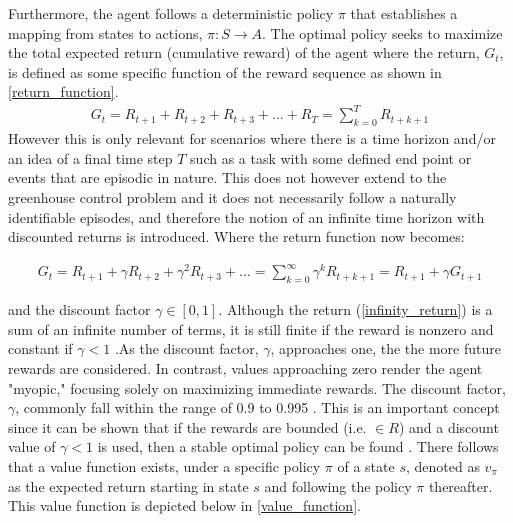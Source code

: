 Furthermore, the agent follows a deterministic policy $\pi$ that establishes a mapping from states to actions, $\pi: S \rightarrow A$. The optimal policy seeks to maximize the total expected return (cumulative reward) of the agent where the return, $G_t$, is defined as some specific function of the reward sequence \cite{suttonReinforcementLearningIntroduction2014} as shown in \autoref{return_function}. 
\begin{equation}
	\begin{aligned}
		G_t  = R_{t+1} + R_{t+2} + R_{t+3} + \dots + R_{T} = \sum_{k=0}^TR_{t+k+1}
	\end{aligned}
	\label{return_function}
\end{equation}
However this is only relevant for scenarios where there is a time horizon and/or an idea of a final time step $T$ such as a task with some defined end point or events that are episodic in nature. This does not however extend to the greenhouse control problem and it does not necessarily follow a naturally identifiable episodes, and therefore the notion of an infinite time horizon with discounted returns is introduced. Where the return function now becomes:

\begin{equation}
	\begin{aligned}
		G_t  = R_{t+1} + \gamma R_{t+2} + \gamma^2 R_{t+3} + \dots = \sum_{k=0}^\infty \gamma^k R_{t+k+1} = R_{t+1} + \gamma G_{t+1}
	\end{aligned}
	\label{infinity_return}
\end{equation}

and the discount factor $\gamma \in [0,1]$. Although the return (\autoref{infinity_return}) is a sum of an infinite number of terms, it is still finite if the reward is nonzero and constant if $\gamma < 1$ \cite{suttonReinforcementLearningIntroduction2014}.As the discount factor, $\gamma$, approaches one, the the more future rewards are considered.  In contrast, values approaching zero render the agent "myopic," focusing solely on maximizing immediate rewards. The discount factor, $\gamma$, commonly fall within the range of 0.9 to 0.995 \cite{vandenbemdRobustDeepReinforcement}. This is an important concept since it can be shown that if the rewards are bounded (i.e. $\in R$) and a discount value of $\gamma <1$ is used, then a stable optimal policy can be found \cite{bertsekasNewtonMethodReinforcement2022}. There follows that a value function exists, under a specific policy $\pi$ of a state $s$, denoted as $v_{\pi}$ as the expected return starting in state $s$ and following the policy $\pi$ thereafter. This value function is depicted below in \autoref{value_function}.


